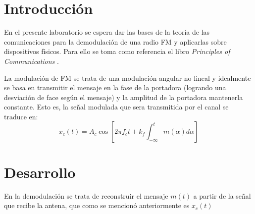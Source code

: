 \section{Introducción}
	En el presente laboratorio se espera dar las bases de la teoría de las comunicaciones para la demodulación de una radio FM y aplicarlas sobre dispositivos físicos.
Para ello se toma como referencia el libro \emph{Principles of Communications} \cite{PrinciplesofCommunications}.

La modulación de FM se trata de una modulación angular no lineal y idealmente se basa en transmitir el mensaje en la fase de la portadora (logrando una desviación de face según el mensaje) y la amplitud de la portadora mantenerla constante. Esto es, la señal modulada que sera transmitida por el canal se traduce en:
$$
	x_c (t) = A_c \cos \left[ 2 \pi f_c t + k_f \int_{-\infty}^{t} m(\alpha) d\alpha \right]
$$

\section{Desarrollo}
En la demodulación se trata de reconstruir el mensaje $m(t)$ a partir de la señal que recibe la antena, que como se mencionó anteriormente es $x_c(t)$